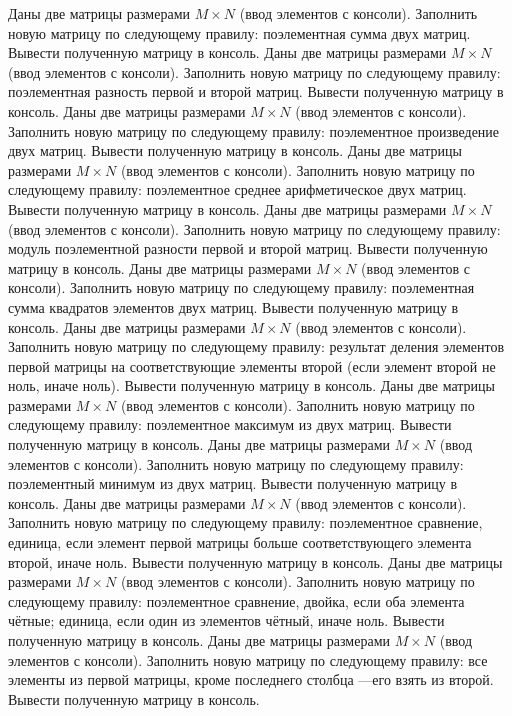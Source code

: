 Даны две матрицы размерами $M \times N$ (ввод элементов с консоли). Заполнить новую матрицу по следующему правилу: поэлементная сумма двух матриц. Вывести полученную матрицу в консоль.
Даны две матрицы размерами $M \times N$ (ввод элементов с консоли). Заполнить новую матрицу по следующему правилу: поэлементная разность первой и второй матриц. Вывести полученную матрицу в консоль.
Даны две матрицы размерами $M \times N$ (ввод элементов с консоли). Заполнить новую матрицу по следующему правилу: поэлементное произведение двух матриц. Вывести полученную матрицу в консоль.
Даны две матрицы размерами $M \times N$ (ввод элементов с консоли). Заполнить новую матрицу по следующему правилу: поэлементное среднее арифметическое двух матриц. Вывести полученную матрицу в консоль.
Даны две матрицы размерами $M \times N$ (ввод элементов с консоли). Заполнить новую матрицу по следующему правилу: модуль поэлементной разности первой и второй матриц. Вывести полученную матрицу в консоль.
Даны две матрицы размерами $M \times N$ (ввод элементов с консоли). Заполнить новую матрицу по следующему правилу: поэлементная сумма квадратов элементов двух матриц. Вывести полученную матрицу в консоль.
Даны две матрицы размерами $M \times N$ (ввод элементов с консоли). Заполнить новую матрицу по следующему правилу: результат деления элементов первой матрицы на соответствующие элементы второй (если элемент второй не ноль, иначе ноль). Вывести полученную матрицу в консоль.
Даны две матрицы размерами $M \times N$ (ввод элементов с консоли). Заполнить новую матрицу по следующему правилу: поэлементное максимум из двух матриц. Вывести полученную матрицу в консоль.
Даны две матрицы размерами $M \times N$ (ввод элементов с консоли). Заполнить новую матрицу по следующему правилу: поэлементный минимум из двух матриц. Вывести полученную матрицу в консоль.
Даны две матрицы размерами $M \times N$ (ввод элементов с консоли). Заполнить новую матрицу по следующему правилу: поэлементное сравнение, единица, если элемент первой матрицы больше соответствующего элемента второй, иначе ноль. Вывести полученную матрицу в консоль.
Даны две матрицы размерами $M \times N$ (ввод элементов с консоли). Заполнить новую матрицу по следующему правилу: поэлементное сравнение, двойка, если оба элемента чётные; единица, если один из элементов чётный, иначе ноль. Вывести полученную матрицу в консоль.
Даны две матрицы размерами $M \times N$ (ввод элементов с консоли). Заполнить новую матрицу по следующему правилу: все элементы из первой матрицы, кроме последнего столбца ---его взять из второй. Вывести полученную матрицу в консоль.
